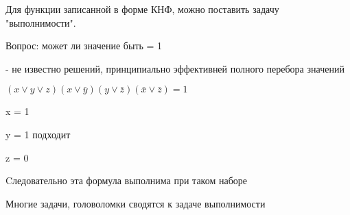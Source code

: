 \documentclass[russian]{lecture-notes}
\begin{document}
	\begin{remark}
		Для функции записанной в форме КНФ, можно поставить задачу "выполнимости".

		Вопрос: может ли значение быть = 1

		- не известно решений, принципиально эффективней полного перебора значений

		\end{remark}

	\begin{example}
	$(x \lor y \lor z)(x \lor \bar{y})(y \lor \bar{z})(\bar{x} \lor \bar{z}) = 1$

		x = 1

		y = 1 \qquad подходит

		z = 0

		Cледовательно эта формула выполнима при таком наборе


	\end{example}

	Многие задачи, головоломки сводятся к задаче выполнимости
\end{document}
